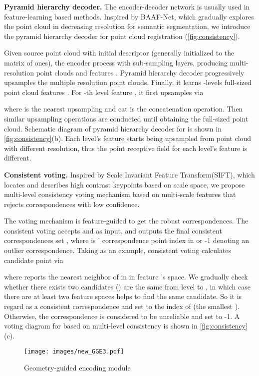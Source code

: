 \documentclass[10pt,twocolumn,letterpaper]{article}
\begin{document}
\textbf{Pyramid hierarchy decoder. }
The encoder-decoder network is usually used in feature-learning based methods. Inspired by BAAF-Net\cite{qiu2021semantic}, which gradually explores the point cloud in decreasing resolution for semantic segmentation, we introduce the pyramid hierarchy decoder for point cloud registration (\cref{fig:consistency}). 

Given source point cloud  with initial descriptor  (generally initialized to the matrix of ones), the encoder process  with  sub-sampling layers, producing multi-resolution point clouds  and features . Pyramid hierarchy decoder progressively upsamples the multiple resolution point clouds. Finally, it learns -levels full-sized point cloud features . For -th level feature , it first upsamples  via 

where  is the nearest upsampling and cat is the concatenation operation. Then similar upsampling operations are conducted until obtaining the full-sized point cloud. Schematic diagram of pyramid hierarchy decoder for  is shown in \cref{fig:consistency}(b). Each level's feature starts being upsampled from point cloud with different resolution, thus the point receptive field for each level's feature is different.

\textbf{Consistent voting. }
Inspired by Scale Invariant Feature Transform(SIFT)\cite{lowe1999object,lowe2004distinctive}, which locates and describes high contrast keypoints based on scale space, we propose multi-level consistency voting mechanism based on multi-scale features that rejects correspondences with low confidence.

The voting mechanism is feature-guided to get the robust correspondences. The consistent voting accepts  and  as input, and outputs the final consistent correspondences set , where  is ' correspondence point index in  or -1 denoting an outlier correspondence. Taking  as an example, consistent voting calculates candidate point via

where  reports the nearest neighbor of  in  in feature 's space. We gradually check whether there exists two candidates () are the same from level  to , in which case there are at least two feature spaces helps to find the same candidate. So it is regard as a consistent correspondence and set  to the index of  (the smallest ). Otherwise, the correspondence is considered to be unreliable and set  to -1. A voting diagram for  based on multi-level consistency is shown in \cref{fig:consistency}(c).

\begin{figure*}[!t]
\centering
\vspace{-.25em}
\texttt{[image: images/new\_GGE3.pdf]}
\vspace{-.75em}
\caption{Geometry-guided encoding module}
\label{fig:gge}
\vspace{-1.5em}
\end{figure*}
\end{document}
